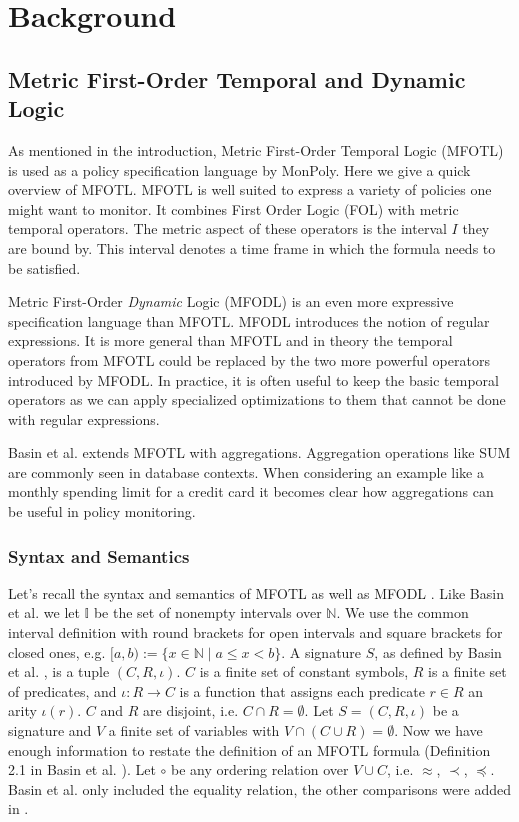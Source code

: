 \chapter{Background}

\section{Metric First-Order Temporal and Dynamic Logic}
As mentioned in the introduction, Metric First-Order Temporal Logic (MFOTL) \cite{Basin2008, Basin2015, Chomicki1995} is used as a policy specification language by MonPoly.
Here we give a quick overview of MFOTL.
MFOTL is well suited to express a variety of policies one might want to monitor.
It combines First Order Logic (FOL) with metric temporal operators.
The metric aspect of these operators is the interval $I$ they are bound by.
This interval denotes a time frame in which the formula needs to be satisfied.


Metric First-Order \textit{Dynamic} Logic (MFODL) \cite{Basin2020} is an even more expressive specification language than MFOTL.
MFODL introduces the notion of regular expressions.
It is more general than MFOTL and in theory the temporal operators from MFOTL could be replaced by the two more powerful operators introduced by MFODL.
In practice, it is often useful to keep the basic temporal operators as we can apply specialized optimizations to them that cannot be done with regular expressions.

Basin et al. \cite{Basin2015aggregations} extends MFOTL with aggregations.
Aggregation operations like SUM are commonly seen in database contexts.
When considering an example like a monthly spending limit for a credit card it becomes clear how aggregations can be useful in policy monitoring.

\subsection{Syntax and Semantics}
Let's recall the syntax and semantics of MFOTL \cite{Basin2008,Basin2015,Schneider2019} as well as MFODL \cite{Basin2020}.
Like Basin et al. \cite{Basin2015} we let $\mathbb{I}$ be the set of nonempty intervals over $\mathbb{N}$.
We use the common interval definition with round brackets for open intervals and square brackets for closed ones, e.g. $[a,b) := \{x \in \mathbb{N} \mid a \leq x < b\}$.
A signature $S$, as defined by Basin et al. \cite{Basin2015}, is a tuple $(C,R,\iota)$.
$C$ is a finite set of constant symbols, $R$ is a finite set of predicates, and $\iota : R \to C$ is a function that assigns each predicate $r \in R$ an arity $\iota(r)$.
$C$ and $R$ are disjoint, i.e. $C \cap R = \emptyset$.
Let $S = (C,R,\iota)$ be a signature and $V$ a finite set of variables with $V \cap (C \cup R) = \emptyset$.
Now we have enough information to restate the definition of an MFOTL formula (Definition 2.1 in Basin et al. \cite{Basin2015}).
Let $\circ$ be any ordering relation over $V \cup C$, i.e. $\approx$, $\prec$, $\preceq$.
Basin et al. \cite{Basin2015} only included the equality relation, the other comparisons were added in \cite{Basin2020}.

